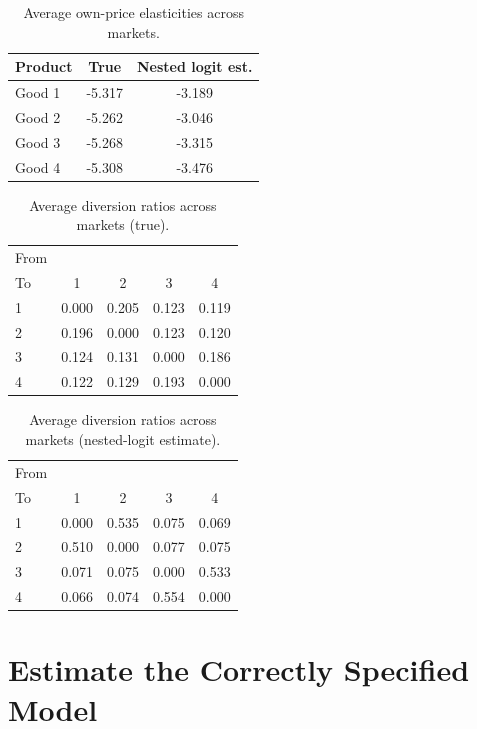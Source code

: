 \documentclass{article}
\begin{document}
\begin{table}[H]
\centering
\caption{Average own-price elasticities across markets.}
\begin{tabular}{lcc}
\hline
Product & True & Nested logit est.\\
\hline
Good 1 & -5.317 & -3.189\\
Good 2 & -5.262 & -3.046\\
Good 3 & -5.268 & -3.315\\
Good 4 & -5.308 & -3.476\\
\hline
\end{tabular}
\end{table}

\begin{table}[H]
\centering
\caption{Average diversion ratios across markets (true).}
\begin{tabular}{lcccc}
\hline
From\\To & 1 & 2 & 3 & 4\\
\hline
1 & 0.000 & 0.205 & 0.123 & 0.119\\
2 & 0.196 & 0.000 & 0.123 & 0.120\\
3 & 0.124 & 0.131 & 0.000 & 0.186\\
4 & 0.122 & 0.129 & 0.193 & 0.000\\
\hline
\end{tabular}
\end{table}

\begin{table}[H]
\centering
\caption{Average diversion ratios across markets (nested-logit estimate).}
\begin{tabular}{lcccc}
\hline
From\\To & 1 & 2 & 3 & 4\\
\hline
1 & 0.000 & 0.535 & 0.075 & 0.069\\
2 & 0.510 & 0.000 & 0.077 & 0.075\\
3 & 0.071 & 0.075 & 0.000 & 0.533\\
4 & 0.066 & 0.074 & 0.554 & 0.000\\
\hline
\end{tabular}
\end{table}




\section*{Estimate the Correctly Specified Model}
\end{document}
